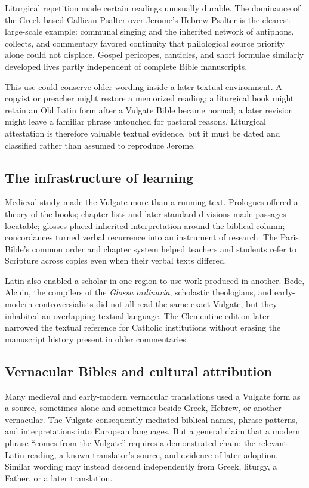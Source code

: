 Liturgical repetition made certain readings unusually durable. The dominance of the Greek-based Gallican Psalter over Jerome's Hebrew Psalter is the clearest large-scale example: communal singing and the inherited network of antiphons, collects, and commentary favored continuity that philological source priority alone could not displace. Gospel pericopes, canticles, and short formulae similarly developed lives partly independent of complete Bible manuscripts.

This use could conserve older wording inside a later textual environment. A copyist or preacher might restore a memorized reading; a liturgical book might retain an Old Latin form after a Vulgate Bible became normal; a later revision might leave a familiar phrase untouched for pastoral reasons. Liturgical attestation is therefore valuable textual evidence, but it must be dated and classified rather than assumed to reproduce Jerome.

\subsection{The infrastructure of learning}

Medieval study made the Vulgate more than a running text. Prologues offered a theory of the books; chapter lists and later standard divisions made passages locatable; glosses placed inherited interpretation around the biblical column; concordances turned verbal recurrence into an instrument of research. The Paris Bible's common order and chapter system helped teachers and students refer to Scripture across copies even when their verbal texts differed.

Latin also enabled a scholar in one region to use work produced in another. Bede, Alcuin, the compilers of the \emph{Glossa ordinaria}, scholastic theologians, and early-modern controversialists did not all read the same exact Vulgate, but they inhabited an overlapping textual language. The Clementine edition later narrowed the textual reference for Catholic institutions without erasing the manuscript history present in older commentaries.

\subsection{Vernacular Bibles and cultural attribution}

Many medieval and early-modern vernacular translations used a Vulgate form as a source, sometimes alone and sometimes beside Greek, Hebrew, or another vernacular. The Vulgate consequently mediated biblical names, phrase patterns, and interpretations into European languages. But a general claim that a modern phrase ``comes from the Vulgate'' requires a demonstrated chain: the relevant Latin reading, a known translator's source, and evidence of later adoption. Similar wording may instead descend independently from Greek, liturgy, a Father, or a later translation.

